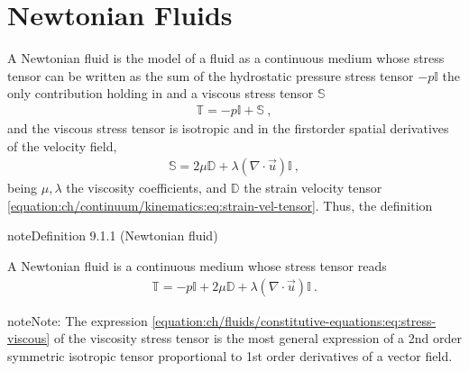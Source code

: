 \documentclass[letterpaper,10pt,english]{jupyterBook}
\begin{document}
\section{Newtonian Fluids}
\label{\detokenize{ch/fluids/constitutive-equations:newtonian-fluids}}\label{\detokenize{ch/fluids/constitutive-equations:fluid-mechanics-constutive-equations-newtonian}}
\sphinxAtStartPar
A Newtonian fluid is the model of a fluid as a continuous medium whose stress tensor can be written as the sum of the hydrostatic pressure stress tensor \(-p \mathbb{I}\) \sphinxhyphen{} the only contribution holding in {\hyperref[\detokenize{ch/fluids/statics:fluid-mechanics-statics}]{}} \sphinxhyphen{} and a viscous stress tensor \(\mathbb{S}\)
\begin{equation*}
\begin{split}\mathbb{T} = -p \mathbb{I} + \mathbb{S} \ ,\end{split}
\end{equation*}
\sphinxAtStartPar
and the viscous stress tensor is isotropic and  in the first\sphinxhyphen{}order spatial derivatives of the velocity field,
\begin{equation}\label{equation:ch/fluids/constitutive-equations:eq:stress-viscous}
\begin{split}\mathbb{S} = 2 \mu \mathbb{D} + \lambda (\nabla \cdot \vec{u}) \mathbb{I} \ ,\end{split}
\end{equation}
\sphinxAtStartPar
being \(\mu, \lambda\) the viscosity coefficients, and \(\mathbb{D}\) the strain velocity tensor \eqref{equation:ch/continuum/kinematics:eq:strain-vel-tensor}. Thus, the definition
\label{ch/fluids/constitutive-equations:definition-0}
\begin{sphinxadmonition}{note}{Definition 9.1.1 (Newtonian fluid)}



\sphinxAtStartPar
A Newtonian fluid is a continuous medium whose stress tensor reads
\begin{equation}\label{equation:ch/fluids/constitutive-equations:eq:stress-newtonian}
\begin{split}\mathbb{T} = - p \mathbb{I} + 2 \mu \mathbb{D} + \lambda (\nabla \cdot \vec{u}) \mathbb{I} \ .\end{split}
\end{equation}\end{sphinxadmonition}

\begin{sphinxadmonition}{note}{Note:}
\sphinxAtStartPar
The expression \eqref{equation:ch/fluids/constitutive-equations:eq:stress-viscous} of the viscosity stress tensor is the most general expression of a 2\sphinxhyphen{}nd order symmetric isotropic tensor proportional to 1\sphinxhyphen{}st order derivatives of a vector field.
\end{sphinxadmonition}
\end{document}
